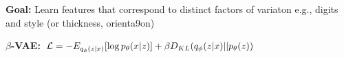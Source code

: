 \textbf{Goal:} Learn features that correspond to distinct factors of variaton e.g., digits and style (or thickness, orienta9on)

\textbf{$\beta$-VAE:} $\mathcal{L} = -E_{q_\phi(z|x)}[\log p_\theta(x|z)] + \beta D_{KL}(q_\phi(z|x) || p_\theta(z))$\\

